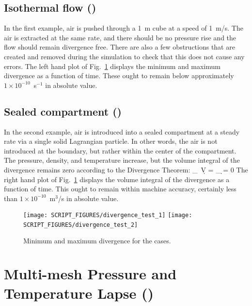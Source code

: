 \documentclass[11pt]{book}
\begin{document}
\subsection{Isothermal flow (\texorpdfstring{}{divergence\_test\_1})}
\label{divergence_test_1}

In the first example, air is pushed through a 1~m cube at a speed of 1~m/s. The air is extracted at the same rate, and there should be no pressure rise and the flow should remain divergence free. There are also a few obstructions that are created and removed during the simulation to check that this does not cause any errors. The left hand plot of Fig.~\ref{divergence_test_fig} displays the minimum and maximum divergence as a function of time. These ought to remain below approximately $1 \times 10^{-10}$~s$^{-1}$ in absolute value.

\subsection{Sealed compartment (\texorpdfstring{}{divergence\_test\_2})}
\label{divergence_test_2}

In the second example, air is introduced into a sealed compartment at a steady rate via a single solid Lagrangian particle. In other words, the air is not introduced at the boundary, but rather within the center of the compartment. The pressure, density, and temperature increase, but the volume integral of the divergence remains zero according to the Divergence Theorem:
\be
   \int_\Omega \nabla \cdot \bu \, \d V = \int_{\partial \Omega} \bu \cdot \d \bS = 0
\ee
The right hand plot of Fig.~\ref{divergence_test_fig} displays the volume integral of the divergence as a function of time. This ought to remain within machine accuracy, certainly less than $1 \times 10^{-10}$~m$^3$/s in absolute value.

\begin{figure}[!ht]
\texttt{[image: SCRIPT\_FIGURES/divergence\_test\_1]}
\texttt{[image: SCRIPT\_FIGURES/divergence\_test\_2]}
\caption[The  cases]{Minimum and maximum divergence for the  cases.}
\label{divergence_test_fig}
\end{figure}

\section{Multi-mesh Pressure and Temperature Lapse (\texorpdfstring{}{lapse\_rate})}
\label{lapse_rate}
\end{document}
